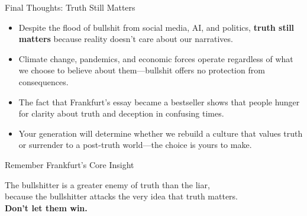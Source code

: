 \documentclass{beamer}
\begin{document}
	\begin{frame}{Final Thoughts: Truth Still Matters}
		\begin{itemize}
			\item Despite the flood of bullshit from social media, AI, and politics, \textbf{truth still matters} because reality doesn't care about our narratives.
			\item Climate change, pandemics, and economic forces operate regardless of what we choose to believe about them—bullshit offers no protection from consequences.
			\item The fact that Frankfurt's essay became a bestseller shows that people hunger for clarity about truth and deception in confusing times.
			\item Your generation will determine whether we rebuild a culture that values truth or surrender to a post-truth world—the choice is yours to make.
		\end{itemize}
		
		\begin{block}{Remember Frankfurt's Core Insight}
			\begin{center}
				\large
				The bullshitter is a greater enemy of truth than the liar,\\
				because the bullshitter attacks the very idea that truth matters.\\
				\vspace{0.5em}
				\textbf{Don't let them win.}
			\end{center}
		\end{block}
	\end{frame}
	
	
\end{document}
